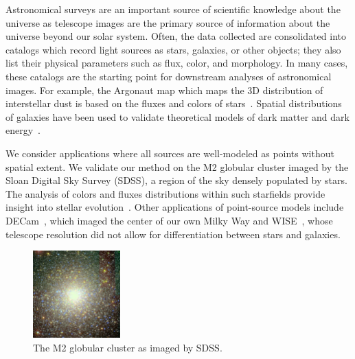 Astronomical surveys are an important source of scientific knowledge about the universe as telescope images are the primary source of information about the universe beyond our solar system. 
Often, the data collected are consolidated into catalogs which record light sources as stars, galaxies, or other objects; 
they also list their physical parameters such as flux, color, and morphology. 
In many cases, these catalogs are the starting point for downstream analyses of astronomical images.
For example, the Argonaut map which maps the 3D distribution of interstellar dust is based on the fluxes and colors of stars~\cite{Green_2019_argonaut}. 
Spatial distributions of galaxies have been used to validate theoretical models of dark matter and dark energy~\cite{Eisenstein_2005_darkmatter}. 

We consider applications where all sources are well-modeled as points without spatial extent.
We validate our method on the M2 globular cluster imaged by the Sloan Digital Sky Survey (SDSS), a region of the sky densely populated by stars.
The analysis of colors and fluxes distributions within
such starfields provide insight into stellar evolution~\cite{Isochrome_fitting}.
Other applications of point-source models include DECam~\cite{Schlafly_2018_DECam}, which imaged the center of our own Milky Way and WISE~\cite{Wright_2010_WISESurvey}, whose telescope resolution did not allow for differentiation between stars and galaxies.


\begin{figure}[!tb]
  \centering
    \includegraphics[width=0.3\textwidth]{figures/m2.png}
  \caption{The M2 globular cluster as imaged by SDSS. }
\end{figure}

